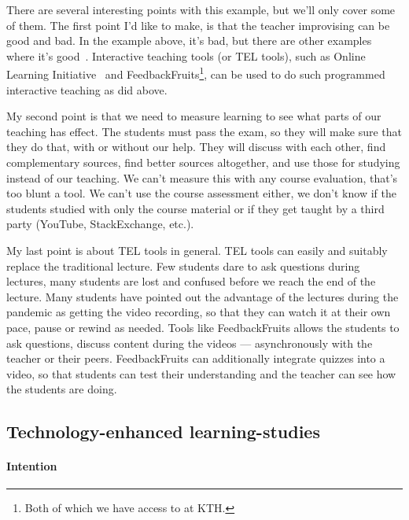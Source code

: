 There are several interesting points with this example, but we'll only cover 
some of them.
The first point I'd like to make, is that the teacher improvising can be good 
and bad.
In the example above, it's bad, but there are other examples where it's 
good~\autocite[cf.][for good examples]{NecessaryConditionsOfLearning}.
Interactive teaching tools (or \ac{TEL} tools), such as Online Learning 
Initiative~\autocite{OLIstatistics} and FeedbackFruits\footnote{%
  Both of which we have access to at KTH.
}, can be used to do such programmed interactive teaching as 
\citeauthor{MeaningsAreAcquired} did above.

My second point is that we need to measure learning to see what parts of our 
teaching has effect.
The students must pass the exam, so they will make sure that they do that, with 
or without our help.
They will discuss with each other, find complementary sources, find better 
sources altogether, and use those for studying instead of our teaching.
We can't measure this with any course evaluation, that's too blunt a tool.
We can't use the course assessment either, we don't know if the students 
studied with only the course material or if they get taught by a third party 
(YouTube, StackExchange, etc.).

My last point is about \ac{TEL} tools in general.
\Ac{TEL} tools can easily and suitably replace the traditional lecture.
Few students dare to ask questions during lectures, many students are lost and 
confused before we reach the end of the lecture.
Many students have pointed out the advantage of the lectures during the 
pandemic as getting the video recording, so that they can watch it at their own 
pace, pause or rewind as needed.
Tools like FeedbackFruits allows the students to ask questions, discuss content 
during the videos --- asynchronously with the teacher or their peers.
FeedbackFruits can additionally integrate quizzes into a video, so that 
students can test their understanding and the teacher can see how the students 
are doing.


\subsection{Technology-enhanced learning-studies}


\paragraph{Intention}

